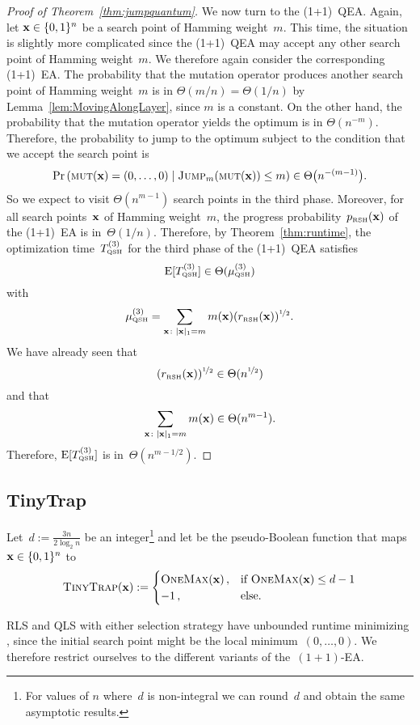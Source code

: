 \documentclass[a4paper,11pt]{article}
\begin{document}
\begin{proof}[Proof of Theorem~\ref{thm:jumpquantum}]
We now turn to the (1+1)~QEA. Again, let $\xvec\in\{0,1\}^n$ be a search point of Hamming weight~$m$. This time, the situation is slightly more complicated since the (1+1)~QEA may accept any other search point of Hamming weight~$m$. We therefore again consider the corresponding (1+1)~EA. The probability that the mutation operator produces another search point of Hamming weight~$m$ is in $\Theta(m/n) = \Theta(1/n)$ by Lemma~\ref{lem:MovingAlongLayer}, since $m$ is a constant. On the other hand, the probability that the mutation operator yields the optimum is in $\Theta(n^{-m})$. Therefore, the probability to jump to the optimum subject to the condition that we accept the search point is
\begin{align*}
\Pr\left(\mut(\xvec) = (0,\ldots,0) \mid \jumpm(\mut(\xvec)) \leq m \right)
\in\Theta\big(n^{-(m-1)}\big).
\end{align*}
So we expect to visit $\Theta(n^{m-1})$ search points in the third phase. Moreover, for all search points~$\xvec$ of Hamming weight~$m$, the progress probability~$p_\RSH(\xvec)$ of the (1+1)~EA is in~$\Theta(1/n)$. Therefore, by Theorem~\ref{thm:runtime}, the optimization time~$T^{(3)}_{\text{\tiny\rm QSH}}$ for the third phase of the (1+1)~QEA satisfies
\[
\operatorname{E}[T^{(3)}_{\text{\tiny\rm QSH}}]\in\Theta(\mu_{\text{\tiny\rm QSH}}^{(3)})
\]
with
\[
\mu_\QSH^{(3)}=\sum_{\xvec\colon \ham{\xvec}=m}m(\xvec) (r_\RSH(\xvec))^{\nicefrac{1}{2}}.
\]
We have already seen that
\[
(r_\RSH(\xvec))^{\nicefrac{1}{2}}\in\Theta(n^{\nicefrac{1}{2}})
\]
and that 
\[
\sum_{\xvec\colon \ham{\xvec}=m}m(\xvec)\in\Theta(n^{m-1}).
\]
Therefore, $\operatorname{E}[T^{(3)}_{\text{\tiny\rm QSH}}]$ is in~$\Theta(n^{m-1/2})$.
\end{proof}

\subsection{TinyTrap}
\label{subsec:tinytrap}
Let~$d:=\frac{3 n}{2\log_2 n}$ be an integer\footnote{For values of $n$ where~$d$ is non-integral we can round~$d$ and obtain the same asymptotic results.} and let \tinytrap be the pseudo-Boolean function that maps $\xvec\in\{0,1\}^n$ to
\begin{equation}
\tinytrap(\xvec):=
\begin{cases}
\onemax(\xvec)\,, & \text{if }\onemax(\xvec)\le d-1 \\
-1\,, & \text{else.}
\end{cases}
\end{equation}

RLS and QLS with either selection strategy have unbounded runtime minimizing \tinytrap, since the initial search point might be the local minimum~$(0,\dots,0)$. We therefore restrict ourselves to the different variants of the~$(1+1)$-EA.
\end{document}
